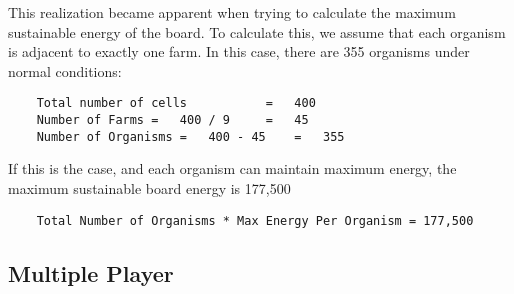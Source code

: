 This realization became apparent when trying to calculate the maximum sustainable energy of the board. To calculate this, we assume that each organism is adjacent to exactly one farm.  In this case, there are 355 organisms under normal conditions:
\begin{verbatim}
	Total number of cells			=	400
	Number of Farms	=	400 / 9 	= 	45
	Number of Organisms = 	400 - 45	= 	355
\end{verbatim}

If this is the case, and each organism can maintain maximum energy, the maximum sustainable board energy is 177,500
\begin{verbatim}
	Total Number of Organisms * Max Energy Per Organism = 177,500
\end{verbatim}





\subsection{Multiple Player}

